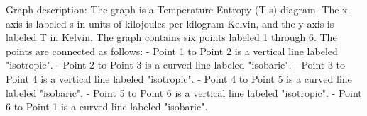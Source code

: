 Graph description: The graph is a Temperature-Entropy (T-s) diagram. The x-axis is labeled s in units of kilojoules per kilogram Kelvin, and the y-axis is labeled T in Kelvin. The graph contains six points labeled 1 through 6. The points are connected as follows:
- Point 1 to Point 2 is a vertical line labeled "isotropic".
- Point 2 to Point 3 is a curved line labeled "isobaric".
- Point 3 to Point 4 is a vertical line labeled "isotropic".
- Point 4 to Point 5 is a curved line labeled "isobaric".
- Point 5 to Point 6 is a vertical line labeled "isotropic".
- Point 6 to Point 1 is a curved line labeled "isobaric".